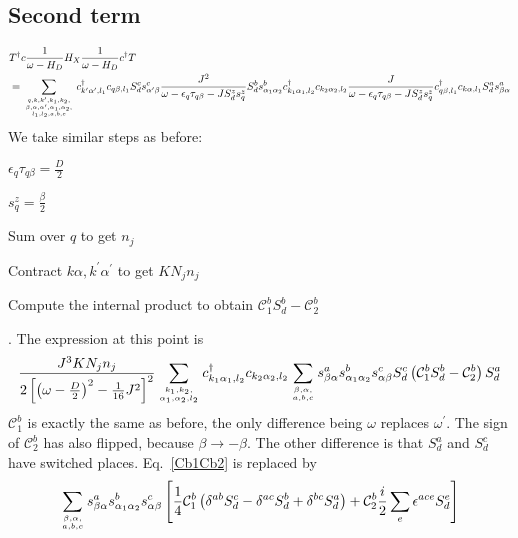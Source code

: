 \documentclass{revtex4-2}
\numberwithin{equation}{section}
\begin{document}
\subsection{Second term}
\begin{equation}\begin{aligned}
	&T^\dagger c \frac{1}{\omega - H_D} H_X \frac{1}{\omega - H_D} c^\dagger T\\
	&= \sum_{q, k, k^\prime, k_1,k_2,\atop{\beta, \alpha, \alpha^\prime, \alpha_1,\alpha_2,\atop{l_1,l_2,a,b,c}}}c^\dagger_{k^\prime\alpha^\prime, l_1} c_{q\beta, l_1}  S_d^c s^c_{\alpha^\prime \beta} \frac{J^2}{\omega - \epsilon_q\tau_{q\beta} - J S_d^z s_q^z} S_d^b s^b_{\alpha_1 \alpha_2} c^\dagger_{k_1\alpha_1,l_2}c_{k_2 \alpha_2,l_2} \frac{J}{\omega - \epsilon_q\tau_{q\beta} - J S_d^z s_q^z} c^\dagger_{q\beta,l_1} c_{k\alpha,l_1} S_d^a s^a_{\beta \alpha}
\end{aligned}\end{equation}
We take similar steps as before:
\begin{inparaenum}
	\item \(\epsilon_q \tau_{q\beta} = \frac{D}{2}\)
	\item \(s^z_q = \frac{\beta}{2}\)
	\item Sum over \(q\) to get \(n_j\)
	\item Contract \(k\alpha,k^\prime\alpha^\prime\) to get \(K N_j n_j\)
	\item Compute the internal product to obtain \(\mathcal{C}_1^b S_d^b - \mathcal{C}_2^b\)
\end{inparaenum}.
The expression at this point is
\begin{equation}\begin{aligned}
	\label{Cb1Cb2_2}
	\frac{J^3 K N_j n_j }{2\left[\left(\omega - \frac{D}{2}\right)^2 - \frac{1}{16}J^2\right]^2}\sum_{k_1,k_2,\atop{\alpha_1,\alpha_2,l_2}}c^\dagger_{k_1\alpha_1,l_2}c_{k_2 \alpha_2,l_2} \sum_{\beta,\alpha, \atop{a,b,c}}s^a_{\beta \alpha} s^b_{\alpha_1 \alpha_2}s^c_{\alpha \beta} S_d^c \left(\mathcal{C}_1^b S_d^b - \mathcal{C}_2^b\right) S_d^a
\end{aligned}\end{equation}
\(\mathcal{C}^b_1\) is exactly the same as before, the only difference being \(\omega\) replaces \(\omega^\prime\). The sign of \(\mathcal{C}^b_2\) has also flipped, because \(\beta \to -\beta\). The other difference is that \(S_d^a\) and \(S_d^c\) have switched places. Eq.~\ref{Cb1Cb2} is replaced by
\begin{equation}\begin{aligned}
	\label{Cb1Cb2_3}
	\sum_{\beta,\alpha, \atop{a,b,c}}s^a_{\beta \alpha} s^b_{\alpha_1 \alpha_2}s^c_{\alpha \beta}\left[\frac{1}{4}\mathcal{C}_1^b \left(\delta^{ab}S_d^c - \delta^{ac}S_d^b + \delta^{bc}S_d^a\right) + \mathcal{C}_2^b \frac{i}{2}\sum_{e}\epsilon^{ace}S_d^e\right]
\end{aligned}\end{equation}
\end{document}
